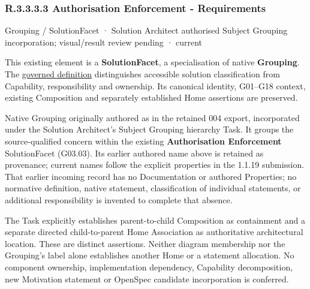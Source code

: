 \subsubsection*{R.3.3.3.3 Authorisation Enforcement - Requirements}
\label{navigation:R.3.3.3.3}

\label{element:9a5487f0dd7b42bca1f791aad1257849}
{\small Grouping / SolutionFacet · Solution Architect authorised Subject Grouping incorporation; visual/result review pending · current}\par

This existing element is a \textbf{SolutionFacet}, a specialisation of native
\textbf{Grouping}. The \href{\detokenize{../../../../../../../governance/continuum-representation.md#solutionfacet-classification--1119-candidate}}{governed definition}
distinguishes accessible solution classification from Capability, responsibility
and ownership. Its canonical identity, G01–G18 context, existing Composition
and separately established Home assertions are preserved.



Native Grouping originally authored as \texttt{} in the retained 004 export,
incorporated under the Solution Architect's Subject Grouping hierarchy Task.
It groups the source-qualified \texttt{} concern within
the existing \textbf{Authorisation Enforcement} SolutionFacet (G03.03). Its earlier authored name above is retained as provenance; current names
follow the explicit properties in the 1.1.19 submission.
That earlier incoming record has no Documentation or authored Properties; no normative
definition, native statement, classification of individual statements, or
additional responsibility is invented to complete that absence.



The Task explicitly establishes parent-to-child Composition as containment and
a separate directed child-to-parent Home Association as authoritative architectural
location. These are distinct assertions. Neither diagram membership nor the
Grouping's label alone establishes another Home or a statement allocation.
No component ownership, implementation dependency, Capability decomposition,
new Motivation statement or OpenSpec candidate incorporation is conferred.



